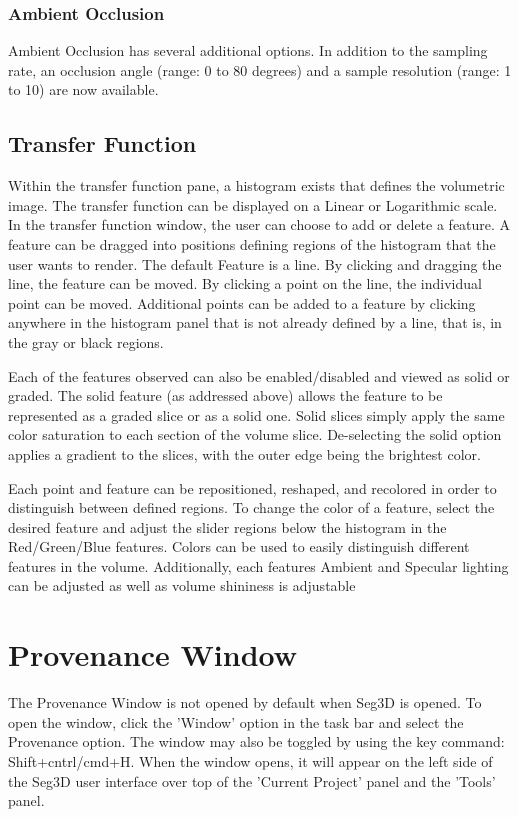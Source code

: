 \documentclass[fleqn,11pt,openany]{book}
\begin{document}
\subsubsection{Ambient Occlusion}
Ambient Occlusion has several additional options.
In addition to the sampling rate, an occlusion angle (range: 0 to 80 degrees) and a sample resolution (range: 1 to 10) are now available.



\subsection{Transfer Function}
Within the transfer function pane, a histogram exists that defines the volumetric image.
The transfer function can be displayed on a Linear or Logarithmic scale.
In the transfer function window, the user can choose to add or delete a feature.
A feature can be dragged into positions defining regions of the histogram that the user wants to render.
The default Feature is a line.  
By clicking and dragging the line, the feature can be moved.
By clicking a point on the line, the individual point can be moved.
Additional points can be added to a feature by clicking anywhere in the histogram panel  that is not already defined by a line, that is, in the gray or black regions.

Each of the features observed can also be enabled/disabled and viewed as solid or graded.
The solid feature (as addressed above) allows the feature to be represented as a graded slice or as a solid one.
Solid slices simply apply the same color saturation to each section of the volume slice.
De-selecting the solid option applies a gradient to the slices, with the outer edge being the brightest color.

Each point and feature can be repositioned, reshaped, and recolored in order to distinguish between defined regions.
To change the color of a feature, select the desired feature and adjust the slider regions below the histogram in the Red/Green/Blue features.
Colors can be used to easily distinguish different features in the volume.
Additionally, each features Ambient and Specular lighting can be adjusted as well as volume shininess is adjustable



\section{Provenance Window}
The Provenance Window is not opened by default when Seg3D is opened. 
To open the window, click the 'Window' option in the task bar and select the Provenance option.  
The window may also be toggled by using the key command: Shift+cntrl/cmd+H.
When the window opens, it will appear on the left side of the Seg3D user interface over top of the 'Current Project' panel and the 'Tools' panel.
\end{document}
